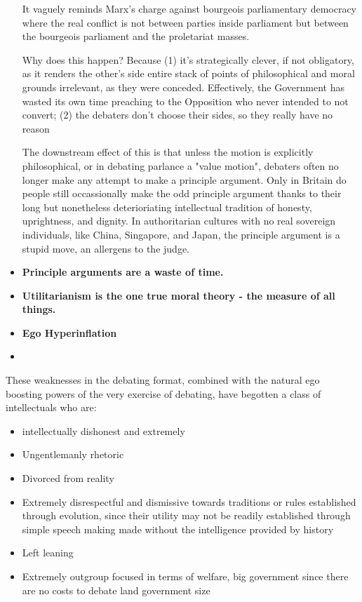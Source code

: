 \begin{itemize}
    It vaguely reminds Marx's charge against bourgeois parliamentary democracy where the real conflict is not between parties inside parliament but between the bourgeois parliament and the proletariat masses.

    Why does this happen? Because (1) it's strategically clever, if not obligatory, as it renders the other's side entire stack of points of philosophical and moral grounds irrelevant, as they were conceded. Effectively, the Government has wasted its own time preaching to the Opposition who never intended to not convert; (2) the debaters don't choose their sides, so they really have no reason 

    The downstream effect of this is that unless the motion is explicitly philosophical, or in debating parlance a "value motion", debaters often no longer make any attempt to make a principle argument. Only in Britain do people still occassionally make the odd principle argument thanks to their long but nonetheless deterioriating intellectual tradition of honesty, uprightness, and dignity. In authoritarian cultures with no real sovereign individuals, like China, Singapore, and Japan, the principle argument is a stupid move, an allergens to the judge.

    \item \textbf{Principle arguments are a waste of time.}
    \item \textbf{Utilitarianism is the one true moral theory - the measure of all things.}
    \item \textbf{Ego Hyperinflation} 
    \item 
\end{itemize}

These weaknesses in the debating format, combined with the natural ego boosting powers of the very exercise of debating, have begotten a class of intellectuals who are:

\begin{itemize}
    \item intellectually dishonest and extremely
    \item Ungentlemanly rhetoric
    \item Divorced from reality
    \item Extremely disrespectful and dismissive towards traditions or rules established through evolution, since their utility may not be readily established through simple speech making made without the intelligence provided by history
    \item Left leaning
    \item Extremely outgroup focused in terms of welfare, big government since there are no costs to debate land government size
\end{itemize}

